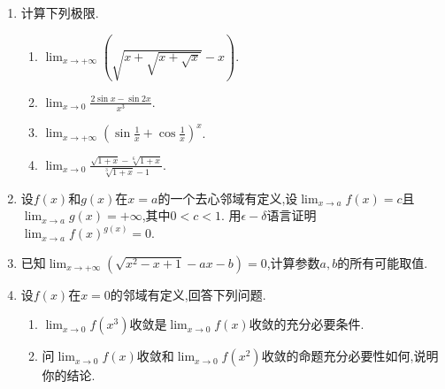 \documentclass[b5paper,oneside]{ctexart}
\begin{document}
\begin{enumerate}[1.]
\begin{enumerate}[(1)]
        \end{enumerate}
    \newpage
    \item 计算下列极限.
        \begin{enumerate}[(1)]
            \item $\lim_{x \to +\infty} (\sqrt{x+\sqrt{x+\sqrt{x}}}-x)$.
            \item $\lim_{x \to 0} \frac{2\sin{x}-\sin{2x}}{x^3}$.
            \item $\lim_{x \to +\infty} (\sin{\frac{1}{x}}+\cos{\frac{1}{x}})^x$.
            \item $\lim_{x \to 0} \frac{\sqrt{1+x}-\sqrt[6]{1+x}}{\sqrt[3]{1+x}-1}$.
        \end{enumerate}
    \newpage
    \item 设$f(x)$和$g(x)$在$x=a$的一个去心邻域有定义,设$\lim_{x \to a} f(x)=c$且$\lim_{x \to a} g(x)=+\infty$,其中$0<c<1$.
        用$\epsilon-\delta$语言证明$\lim_{x \to a} {f(x)}^{g(x)}=0$.
    \newpage
    \item 已知$\lim_{x \to +\infty} (\sqrt{x^2-x+1}-ax-b)=0$,计算参数$a,b$的所有可能取值.
    \newpage
    \item 设$f(x)$在$x=0$的邻域有定义,回答下列问题.
        \begin{enumerate}[(1)]
            \item $\lim_{x \to 0} f(x^3)$收敛是$\lim_{x \to 0} f(x)$收敛的充分必要条件.
            \item 问$\lim_{x \to 0} f(x)$收敛和$\lim_{x \to 0} f(x^2)$收敛的命题充分必要性如何,说明你的结论.
        \end{enumerate}
\end{enumerate}
\end{document}
